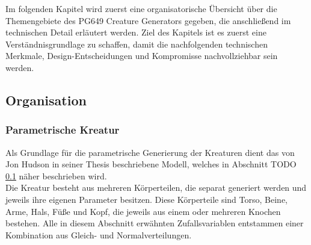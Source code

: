 \DeclarePairedDelimiter\norm{\lVert}{\rVert}

Im folgenden Kapitel wird zuerst eine organisatorische Übersicht über die Themengebiete des PG649 Creature Generators gegeben, die anschließend im technischen Detail erläutert werden. Ziel des Kapitels ist es zuerst eine Verständnisgrundlage zu schaffen, damit die nachfolgenden technischen Merkmale, Design-Entscheidungen und Kompromisse nachvollziehbar sein werden.

\subsection{Organisation}

\subsubsection{Parametrische Kreatur}\label{param_method}
Als Grundlage für die parametrische Generierung der Kreaturen dient das von Jon Hudson in seiner Thesis \cite{Hudson2013CreatureGU} beschriebene Modell, welches in Abschnitt TODO \ref{} näher beschrieben wird.\\
Die Kreatur besteht aus mehreren Körperteilen, die separat generiert werden und jeweils ihre eigenen Parameter besitzen. Diese Körperteile sind Torso, Beine, Arme, Hals, Füße und Kopf, die jeweils aus einem oder mehreren Knochen bestehen. Alle in diesem Abschnitt erwähnten Zufallsvariablen entstammen einer Kombination aus Gleich- und Normalverteilungen.

